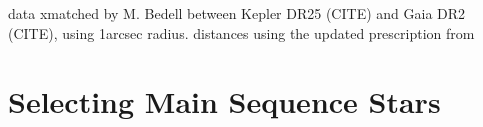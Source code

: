 \documentclass[preprint2]{aastex62}
\newcommand{\Kepler}{\textsl{Kepler}\xspace}
\begin{document}



data xmatched by M. Bedell between Kepler DR25 (CITE) and Gaia DR2 (CITE), using 1arcsec radius.
distances using the updated prescription from \citet{bailer-jones2018}




\section{Selecting Main Sequence Stars}
\end{document}
